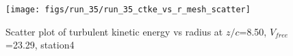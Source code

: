 \begin{figure}[H]
\centering
\texttt{[image: figs/run\_35/run\_35\_ctke\_vs\_r\_mesh\_scatter]}
\caption{Scatter plot of turbulent kinetic energy vs radius at $z/c$=8.50, $V_{free}$=23.29, station4}
\label{fig:run_35_ctke_vs_r_mesh_scatter}
\end{figure}



